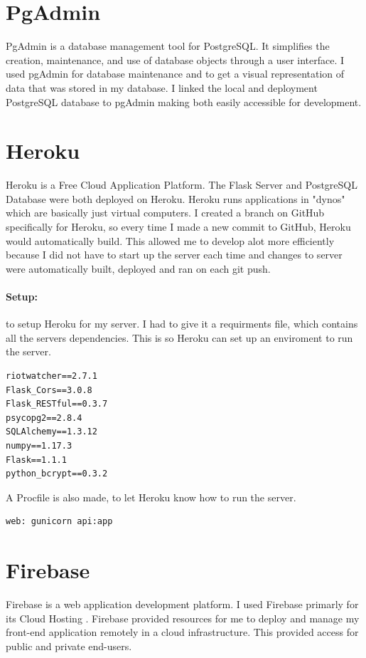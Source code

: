 \section{PgAdmin}
PgAdmin \cite{pgadmin} is a database management tool for PostgreSQL. It simplifies the creation, maintenance, and use of database objects through a user interface. I used pgAdmin for database maintenance and to get a visual representation of data that was stored in my database. I linked the local and deployment PostgreSQL database to pgAdmin making both easily accessible for development.
\section{Heroku}
Heroku \cite{heroku} is a Free Cloud Application Platform. The Flask Server and PostgreSQL Database were both deployed on Heroku. Heroku runs applications in "dynos" which are basically just virtual computers. I created a branch on GitHub specifically for Heroku, so every time I made a new commit to GitHub, Heroku would automatically build. This allowed me to develop alot more efficiently because I did not have to start up the server each time and changes to server were automatically built, deployed and ran on each git push. 
\paragraph{Setup:} to setup Heroku for my server. I had to give it a requirments file, which contains all the servers dependencies. This is so Heroku can set up an enviroment to run the server.
\begin{verbatim}
riotwatcher==2.7.1
Flask_Cors==3.0.8
Flask_RESTful==0.3.7
psycopg2==2.8.4
SQLAlchemy==1.3.12
numpy==1.17.3
Flask==1.1.1
python_bcrypt==0.3.2
\end{verbatim}
A Procfile is also made, to let Heroku know how to run the server.
\begin{verbatim}
web: gunicorn api:app
\end{verbatim}
\newpage
\section{Firebase}
Firebase \cite{firebase} is a web application development platform. I used Firebase primarly for its Cloud Hosting \cite{peteva2017cloud}. Firebase provided resources for me to deploy and manage my front-end application remotely in a cloud infrastructure. This provided access for public and private end-users.
